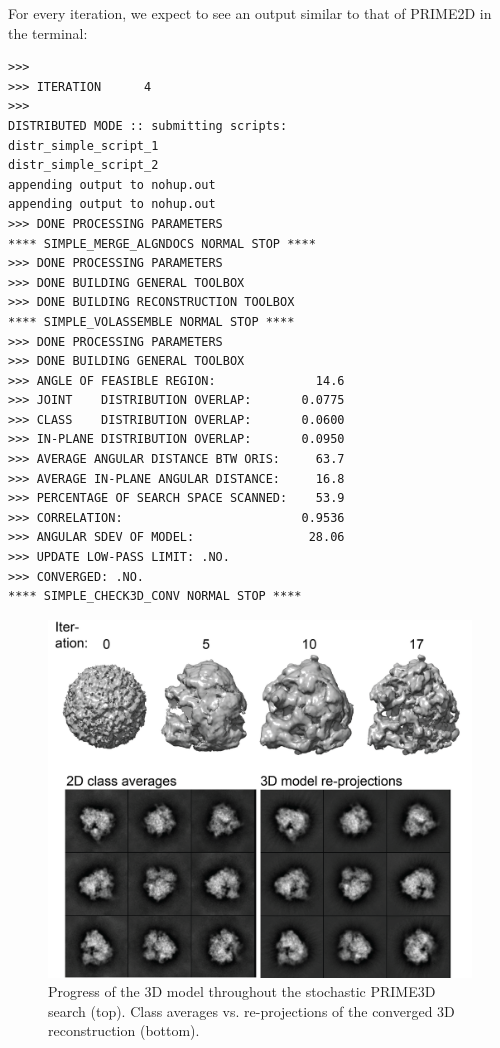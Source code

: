 \documentclass[a4paper,11pt]{article}
\begin{document}
For every iteration, we expect to see an output similar to that of PRIME2D in the terminal:
\begin{verbatim}
>>>
>>> ITERATION      4
>>>
DISTRIBUTED MODE :: submitting scripts:
distr_simple_script_1
distr_simple_script_2
appending output to nohup.out
appending output to nohup.out
>>> DONE PROCESSING PARAMETERS
**** SIMPLE_MERGE_ALGNDOCS NORMAL STOP ****
>>> DONE PROCESSING PARAMETERS
>>> DONE BUILDING GENERAL TOOLBOX
>>> DONE BUILDING RECONSTRUCTION TOOLBOX
**** SIMPLE_VOLASSEMBLE NORMAL STOP ****
>>> DONE PROCESSING PARAMETERS
>>> DONE BUILDING GENERAL TOOLBOX
>>> ANGLE OF FEASIBLE REGION:              14.6
>>> JOINT    DISTRIBUTION OVERLAP:       0.0775
>>> CLASS    DISTRIBUTION OVERLAP:       0.0600
>>> IN-PLANE DISTRIBUTION OVERLAP:       0.0950
>>> AVERAGE ANGULAR DISTANCE BTW ORIS:     63.7
>>> AVERAGE IN-PLANE ANGULAR DISTANCE:     16.8
>>> PERCENTAGE OF SEARCH SPACE SCANNED:    53.9
>>> CORRELATION:                         0.9536
>>> ANGULAR SDEV OF MODEL:                28.06
>>> UPDATE LOW-PASS LIMIT: .NO.
>>> CONVERGED: .NO.
**** SIMPLE_CHECK3D_CONV NORMAL STOP ****
\end{verbatim}
\begin{figure}[H]
\includegraphics[keepaspectratio=true,scale=0.6]{./Pfrib3D/Pfrib3D}
\caption{Progress of the 3D model throughout the stochastic PRIME3D search (top). Class averages vs. re-projections of the converged 3D reconstruction (bottom).}
\end{figure}
\end{document}

